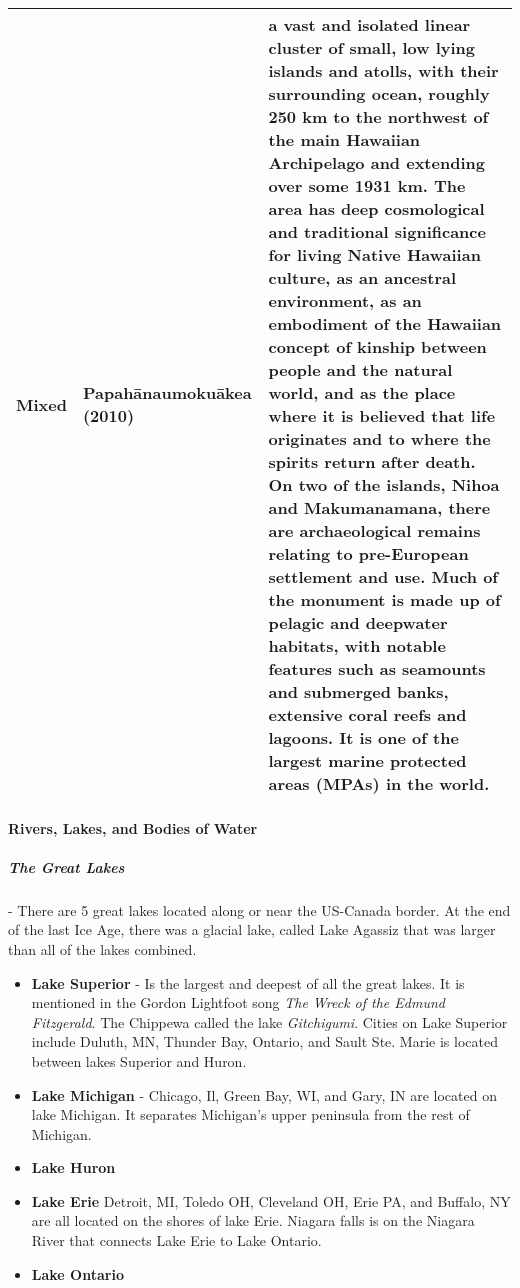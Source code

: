 \begin{longtable}{|c|p{1.5 in}|p{4in}|}
			\hline
			Mixed & Papah\=anaumoku\={a}kea (2010) & a vast and isolated linear cluster of small, low lying islands and atolls, with their surrounding ocean, roughly 250 km to the northwest of the main Hawaiian Archipelago and extending over some 1931 km. The area has deep cosmological and traditional significance for living Native Hawaiian culture, as an ancestral environment, as an embodiment of the Hawaiian concept of kinship between people and the natural world, and as the place where it is believed that life originates and to where the spirits return after death. On two of the islands, Nihoa and Makumanamana, there are archaeological remains relating to pre-European settlement and use. Much of the monument is made up of pelagic and deepwater habitats, with notable features such as seamounts and submerged banks, extensive coral reefs and lagoons. It is one of the largest marine protected areas (MPAs) in the world. \\
			\hline
			
		\end{longtable}
			
			
			\newpage
			\paragraph{Rivers, Lakes, and Bodies of Water}
				\subparagraph{The Great Lakes} - There are 5 great lakes located along or near the US-Canada border.  At the end of the last Ice Age, there was a glacial lake, called Lake Agassiz that was larger than all of the lakes combined.  
				
				\begin{itemize}
					\item \textbf{Lake Superior} - Is the largest and deepest of all the great lakes.  It is mentioned in the Gordon Lightfoot song \textit{The Wreck of the Edmund Fitzgerald}.  The Chippewa called the lake \textit{Gitchigumi}.  Cities on Lake Superior include Duluth, MN, Thunder Bay, Ontario, and Sault Ste. Marie is located  between lakes Superior and Huron.  
					
					\item \textbf{Lake Michigan} - Chicago, Il, Green Bay, WI, and Gary, IN are located on lake Michigan.  It separates Michigan's upper peninsula from the rest of Michigan.  
					
					
					\item \textbf{Lake Huron}
					\item \textbf{Lake Erie}  Detroit, MI, Toledo OH, Cleveland OH, Erie PA, and Buffalo, NY are all located on the shores of lake Erie.  Niagara falls is on the Niagara River that connects Lake Erie to Lake Ontario.  
					
					\item \textbf{Lake Ontario}
				\end{itemize}
								
